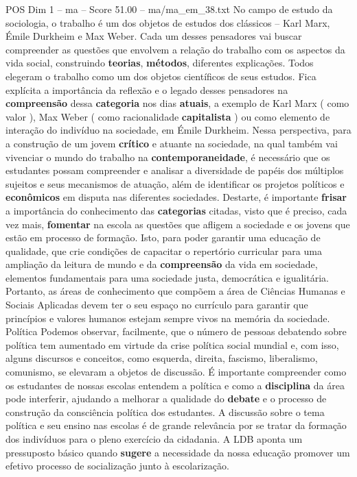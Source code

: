 \begin{textsample}{POS Dim 1 – ma – Score 51.00 – ma/ma\_em\_38.txt}
No campo de estudo da sociologia, o trabalho é um dos objetos de estudos dos clássicos – Karl Marx, Émile Durkheim e Max Weber.
Cada um desses pensadores vai buscar compreender as questões que envolvem a relação do trabalho com os aspectos da vida social, construindo \textbf{teorias}, \textbf{métodos}, diferentes explicações.
Todos elegeram o trabalho como um dos objetos científicos de seus estudos.
Fica explícita a importância da reflexão e o legado desses pensadores na \textbf{compreensão} dessa \textbf{categoria} nos dias \textbf{atuais}, a exemplo de Karl Marx ( como valor ), Max Weber ( como racionalidade \textbf{capitalista} ) ou como elemento de interação do indivíduo na sociedade, em Émile Durkheim.
Nessa perspectiva, para a construção de um jovem \textbf{crítico} e atuante na sociedade, na qual também vai vivenciar o mundo do trabalho na \textbf{contemporaneidade}, é necessário que os estudantes possam compreender e analisar a diversidade de papéis dos múltiplos sujeitos e seus mecanismos de atuação, além de identificar os projetos políticos e \textbf{econômicos} em disputa nas diferentes sociedades.
Destarte, é importante \textbf{frisar} a importância do conhecimento das \textbf{categorias} citadas, visto que é preciso, cada vez mais, \textbf{fomentar} na escola as questões que afligem a sociedade e os jovens que estão em processo de formação.
Isto, para poder garantir uma educação de qualidade, que crie condições de capacitar o repertório curricular para uma ampliação da leitura de mundo e da \textbf{compreensão} da vida em sociedade, elementos fundamentais para uma sociedade justa, democrática e igualitária.
Portanto, as áreas de conhecimento que compõem a área de Ciências Humanas e Sociais Aplicadas devem ter o seu espaço no currículo para garantir que princípios e valores humanos estejam sempre vivos na memória da sociedade.
Política Podemos observar, facilmente, que o número de pessoas debatendo sobre política tem aumentado em virtude da crise política social mundial e, com isso, alguns discursos e conceitos, como esquerda, direita, fascismo, liberalismo, comunismo, se elevaram a objetos de discussão.
É importante compreender como os estudantes de nossas escolas entendem a política e como a \textbf{disciplina} da área pode interferir, ajudando a melhorar a qualidade do \textbf{debate} e o processo de construção da consciência política dos estudantes.
A discussão sobre o tema política e seu ensino nas escolas é de grande relevância por se tratar da formação dos indivíduos para o pleno exercício da cidadania.
A LDB aponta um pressuposto básico quando \textbf{sugere} a necessidade da nossa educação promover um efetivo processo de socialização junto à escolarização.

\end{textsample}
